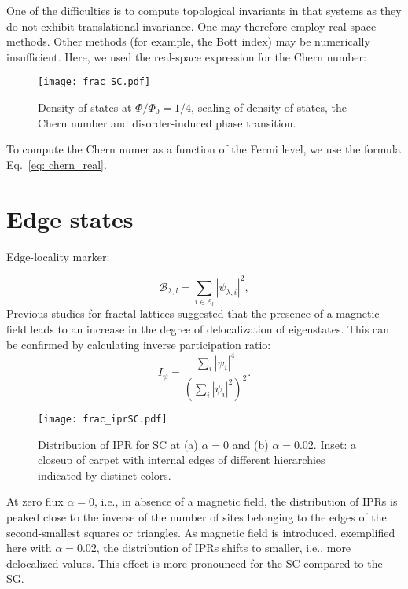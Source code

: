 One of the difficulties is to compute topological invariants in that systems as they do not exhibit translational invariance. One may therefore employ real-space methods. Other methods (for example, the Bott index) may be numerically insufficient. Here, we used the real-space expression for the Chern number:





\begin{figure}
\centering
\texttt{[image: frac\_SC.pdf]} 
\caption{Density of states at $\Phi / \Phi_0 = 1/4$, scaling of density of states, the Chern number and disorder-induced phase transition.}
\label{fig:flux_distr}
\end{figure}

To compute the Chern numer as a function of the Fermi level, we use the formula Eq.~\eqref{eq: chern_real}.


\section{Edge states}

Edge-locality marker:

\begin{equation}
\mathcal{B}_{\lambda, l} = \sum_{i \in \mathcal{E}_l} | \psi_{\lambda,i} |^2, 
\label{eq:edgemarker}
\end{equation}
Previous studies for fractal lattices \cite{supp1, supp2} suggested that the presence of a magnetic field leads to an increase in the degree of delocalization of eigenstates. This can be confirmed by calculating inverse participation ratio:
\begin{equation}
I_{\psi} = \frac{\sum_i | \psi_i |^4}{\left(\sum_i  |\psi_i |^2 \right)^2}.
\label{eq:ipr}
\end{equation}

\begin{figure}[h]
\centering
\texttt{[image: frac\_iprSC.pdf]}
\caption{Distribution of IPR for SC at (a) $\alpha = 0$ and (b) $\alpha = 0.02$. Inset: a closeup of carpet with internal edges of different hierarchies indicated by distinct colors.}
\label{fig:IPR_SC}
\end{figure}
At zero flux $\alpha = 0$, i.e., in absence of a magnetic field, the distribution of IPRs is peaked close to the inverse of the number of sites belonging to the edges of the second-smallest squares or triangles. As magnetic field is introduced, exemplified here with $\alpha = 0.02$, the distribution of IPRs shifts to smaller, i.e., more delocalized values. This effect is more pronounced for the SC compared to the SG.

